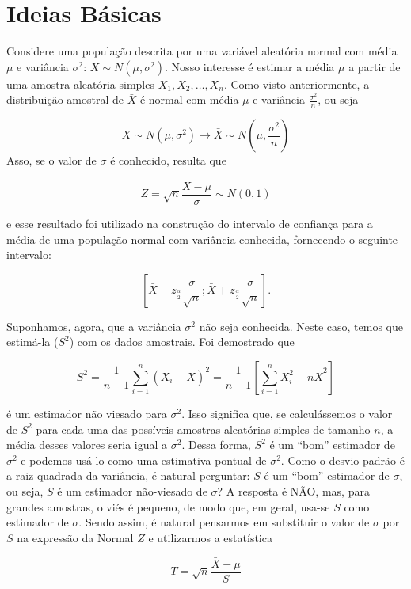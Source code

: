 \documentclass[
]{book}
\begin{document}
\hypertarget{ideias-buxe1sicas-1}{%
\section{Ideias Básicas}\label{ideias-buxe1sicas-1}}

Considere uma população descrita por uma variável aleatória normal com média \(\mu\) e variância \(\sigma^2\): \(X\sim N(\mu,\sigma^2)\). Nosso interesse é estimar a média \(\mu\) a partir de uma amostra aleatória simples \(X_1,X_2,\ldots,X_n\). Como visto anteriormente, a distribuição amostral de \(\bar X\) é normal com média \(\mu\) e variância \(\frac{\sigma^2}{n}\), ou seja

\[X\sim N(\mu,\sigma^2)\rightarrow \bar X \sim N\left(\mu,\frac{\sigma^2}{n}\right)\]
Asso, se o valor de \(\sigma\) é conhecido, resulta que

\[Z=\sqrt{n}\frac{\bar X-\mu}{\sigma}\sim N(0,1)\]

e esse resultado foi utilizado na construção do intervalo de confiança para a média de uma população normal com variância conhecida, fornecendo o seguinte intervalo:

\[\left[\bar X-z_{\frac{\alpha}{2}}\frac{\sigma}{\sqrt{n}};\bar X+z_{\frac{\alpha}{2}}\frac{\sigma}{\sqrt{n}}\right].\]

Suponhamos, agora, que a variância \(\sigma^2\) não seja conhecida. Neste caso, temos que estimá-la (\(S^2\)) com os dados amostrais. Foi demostrado que

\[S^2=\frac{1}{n-1}\sum_{i=1}^{n}(X_i-\bar X)^2=\frac{1}{n-1}\left[\sum_{i=1}^{n}X_i^2-n\bar X^2\right]\]

é um estimador não viesado para \(\sigma^2\). Isso significa que, se calculássemos o valor de \(S^2\) para cada uma das possíveis amostras aleatórias simples de tamanho \(n\), a média desses valores seria igual a \(\sigma^2\). Dessa forma, \(S^2\) é um ``bom'' estimador de \(\sigma^2\) e podemos usá-lo como uma estimativa pontual de \(\sigma^2\). Como o desvio padrão é a raiz quadrada da variância, é natural perguntar: \(S\) é um ``bom'' estimador de \(\sigma\), ou seja, \(S\) é um estimador não-viesado de \(\sigma\)? A resposta é NÃO, mas, para grandes amostras, o viés é pequeno, de modo que, em geral, usa-se \(S\) como estimador de \(\sigma\). Sendo assim, é natural pensarmos em substituir o valor de \(\sigma\) por \(S\) na expressão da Normal \(Z\) e utilizarmos a estatística

\[T=\sqrt{n}\frac{\bar X-\mu}{S}\]
\end{document}
